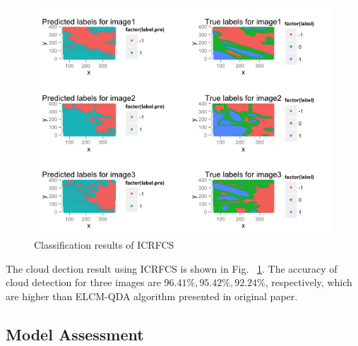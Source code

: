 \documentclass[english]{article}\usepackage{graphicx, color}
\numberwithin{equation}{section}
\numberwithin{figure}{section}
\begin{document}
\begin{figure}[!h]
  \begin{center}
    \includegraphics[width=\columnwidth]{figures/CRF.png}
  \end{center}
  \caption{Classification results of ICRFCS}
  \label{fig:ICRFCS}
\end{figure}

The cloud dection result using ICRFCS is shown in Fig. ~\ref{fig:ICRFCS}. The 
accuracy of cloud detection for three images are $96.41\%, 95.42\%, 92.24\%$, 
respectively, which are higher than ELCM-QDA algorithm presented in original 
paper.

\subsection{Model Assessment}
\end{document}
